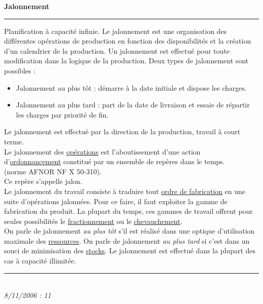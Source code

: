 \documentclass[12pt,a4paper,twoside]{article}
\newcommand{\definition}[3]{
	\begin{minipage}{\textwidth}
		\textbf{\large{#1}}\\
		\rule{\textwidth}{0.5pt}
		#2\\
		\ifthenelse{\isempty{#3}}%
	    {}%
	    {\rule{\textwidth}{0.25pt}\\\textit{#3}}%
    \end{minipage}
    \\\\
}
\begin{document}
\definition{Jalonnement}
{
	Planification à capacité infinie.
	Le jalonnement est une organisation des différentes opérations de production en fonction des disponibilités et la création d'un calendrier de la production. Un jalonnement est effectué pour toute modification dans la logique de la production.
	Deux types de jalonnement sont possibles :
	\begin{itemize}
	\item Jalonnement au plus tôt : démarre à la date initiale et dispose les charges.
	\item Jalonnement au plus tard : part de la date de livraison et essaie de répartir les charges par priorité de fin.
	\end{itemize}
	Le jalonnement est effectué par la direction de la production, travail à court terme.\\
	Le jalonnement des \href{http://gpr.insa-lyon.fr/supgedem/Home/glossaire/glesoper.htm}{opérations} est l'aboutissement d'une action d'\href{http://gpr.insa-lyon.fr/supgedem/Home/Le_monde_industriel/L_entreprise/La_gestion_de_production/Le_pilotage_des_taches_et_des_ressources/ordonnac.htm}{ordonnancement} constitué par un ensemble de repères dans le temps.\\(norme AFNOR NF X 50-310).\\
	Ce repère s'appelle jalon.\\
	Le jalonnement du travail consiste à traduire tout \href{http://gpr.insa-lyon.fr/supgedem/Home/Le_monde_industriel/L_entreprise/La_gestion_de_production/Le_pilotage_des_taches_et_des_ressources/lesordres.htm}{ordre de fabrication} en une suite d'opérations jalonnées. Pour ce faire, il faut exploiter la gamme de fabrication du produit. La plupart du temps, ces gammes de travail offrent pour seules possibilités le \href{http://gpr.insa-lyon.fr/supgedem/Home/Le_monde_industriel/L_entreprise/La_gestion_de_production/Le_pilotage_des_taches_et_des_ressources/fraction.htm}{fractionnement} ou le \href{http://gpr.insa-lyon.fr/supgedem/Home/Le_monde_industriel/L_entreprise/La_gestion_de_production/Le_pilotage_des_taches_et_des_ressources/le_chevauchement.htm}{chevauchement}.\\
On parle de jalonnement \textit{au plus tôt} s'il est réalisé dans une optique d'utilisation maximale des  \href{http://gpr.insa-lyon.fr/supgedem/Home/glossaire/gLesressources.htm}{ressources}. On parle de jalonnement \textit{au plus tard} si c'est dans un souci de minimisation des \href{http://gpr.insa-lyon.fr/supgedem/Home/glossaire/gLestock.htm}{stocks}.
Le jalonnement est effectué dans la plupart des cas à capacité illimitée.
	}{8/11/2006 : 11}
		
\end{document}
